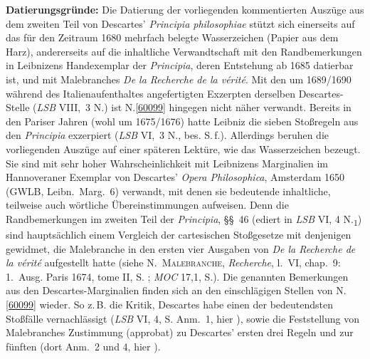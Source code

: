 \begin{ledgroup}
\footnotesize
\pstart
\noindent%
\textbf{Datierungsgründe:}	
Die Datierung %
der vorliegenden kommentierten Auszüge aus dem zweiten Teil von
Descartes' \cite{00035}\textit{Principia philosophiae}
stützt sich einerseits
auf das für den Zeitraum 1680 mehrfach belegte Wasserzeichen (Papier aus dem Harz),
andererseits
auf die inhaltliche Verwandtschaft mit den Randbemerkungen in Leibnizens Handexemplar der \cite{00035}\textit{Principia}, deren Entstehung ab 1685 datierbar ist, 
und mit Malebranches \cite{02080}\textit{De la Recherche de la vérité}.
Mit den um 1689/1690 während des Italienaufenthaltes angefertigten Exzerpten derselben Descartes-Stelle
(\cite{02091}\textit{LSB} VIII,~3 N.)
ist N.\;\ref{60099} hingegen nicht näher verwandt.
\pend
\pstart
Bereits in den Pariser Jahren (wohl um 1675/1676) hatte Leibniz die sieben Stoßregeln aus den \cite{00035}\textit{Principia} exzerpiert (\cite{01302}\textit{LSB} VI,~3 N., bes. S.\,f.).
Allerdings beruhen die vorliegenden Auszüge auf einer späteren Lektüre, wie das Wasserzeichen bezeugt.
Sie sind mit sehr hoher Wahrscheinlichkeit mit 
Leibnizens \cite{01301}Marginalien im Hannoveraner Exemplar von 
Descartes' \cite{01300}\textit{Opera Philosophica}, Amsterdam 1650 
(GWLB, Leibn.~Marg.~6)
verwandt,
mit denen sie bedeutende inhaltliche, teilweise auch wörtliche Übereinstimmungen aufweisen.
Denn die Randbemerkungen im zweiten Teil der \textit{Principia}, §§~46 (ediert in \cite{01301}\textit{LSB} VI, 4 N.\textsubscript{1}) 
sind hauptsächlich einem Vergleich der cartesischen Stoßgesetze mit denjenigen gewidmet, die
Malebranche
in den ersten vier Ausgaben von \cite{02080}\textit{De la Recherche de la vérité} aufgestellt hatte
(siehe \textsc{N.~Malebranche}, \cite{02080}\textit{Recherche}, l.~VI, chap.~9:
1.~Ausg. Paris 1674, tome II, S. \rbrack;
\cite{02079}\textit{MOC} 17,1, S.).
Die genannten Bemerkungen aus den Descartes-Marginalien finden sich an den einschlägigen Stellen von N.\;\ref{60099} wieder.
So z.\,B. die Kritik, Descartes habe einen der bedeutendsten Stoßfälle vernachlässigt 
(\cite{01301}\textit{LSB} VI, 4, S. Anm.~1, hier ),
sowie die Feststellung von Malebranches Zustimmung (\glqq approbat\grqq) zu Descartes' ersten drei Regeln und zur fünften (dort Anm.~2 und 4, hier ).

\end{ledgroup}

